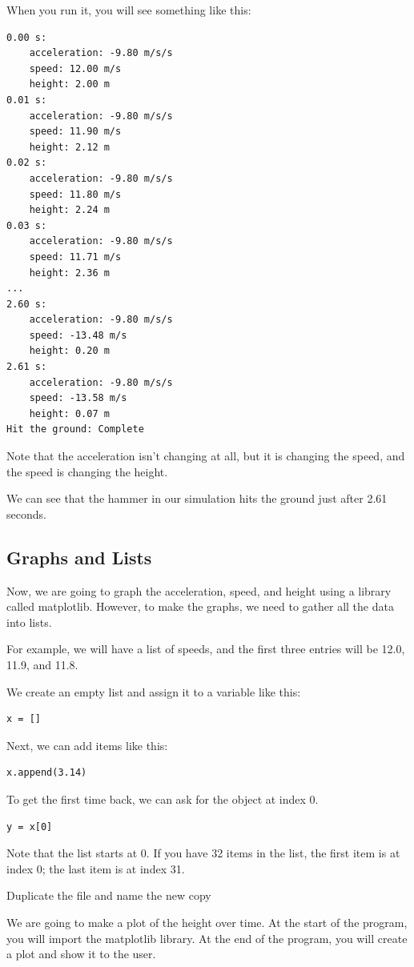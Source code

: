 When you run it, you will see something like this:
\begin{verbatim}
0.00 s:
	acceleration: -9.80 m/s/s
	speed: 12.00 m/s
	height: 2.00 m
0.01 s:
	acceleration: -9.80 m/s/s
	speed: 11.90 m/s
	height: 2.12 m
0.02 s:
	acceleration: -9.80 m/s/s
	speed: 11.80 m/s
	height: 2.24 m
0.03 s:
	acceleration: -9.80 m/s/s
	speed: 11.71 m/s
	height: 2.36 m
...
2.60 s:
	acceleration: -9.80 m/s/s
	speed: -13.48 m/s
	height: 0.20 m
2.61 s:
	acceleration: -9.80 m/s/s
	speed: -13.58 m/s
	height: 0.07 m
Hit the ground: Complete
\end{verbatim}

Note that the acceleration isn't changing at all, but it is changing
the speed, and the speed is changing the height.

We can see that the hammer in our simulation hits the ground just
after 2.61 seconds.

\subsection{Graphs and Lists}

Now, we are going to graph the acceleration, speed, and height using a
library called matplotlib. However, to make the graphs, we
need to gather all the data into lists.

For example, we will have a list of speeds, and the first three
entries will be 12.0, 11.9, and 11.8.

We create an empty list and assign it to a variable like this:
\begin{verbatim}
x = []
\end{verbatim}

Next, we can add items like this:
\begin{verbatim}
x.append(3.14)
\end{verbatim}

To get the first time back, we can ask for the object at index 0.
\begin{verbatim}
y = x[0]
\end{verbatim}
Note that the list starts at 0. If you have 32 items in the list,
the first item is at index 0; the last item is at index 31.

Duplicate the file  and name the new copy 

We are going to make a plot of the height over time. At the start of the 
program, you will import the matplotlib library.  At the end of the program, 
you will create a plot and show it to the user.

